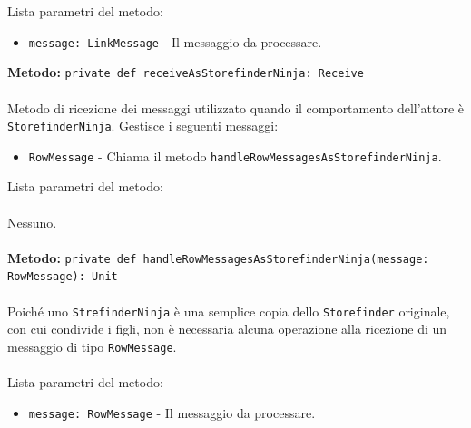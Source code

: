 \documentclass[a4paper]{article}
\begin{document}
			Lista parametri del metodo:
			\begin{itemize}
				\item \texttt{message: LinkMessage} - Il messaggio da processare.
			\end{itemize}	
		\textbf{Metodo: }\texttt{private def receiveAsStorefinderNinja: Receive}
			\\ \\
			Metodo di ricezione dei messaggi utilizzato quando il comportamento dell'attore è \texttt{StorefinderNinja}. Gestisce i seguenti messaggi:
			\begin{itemize}
				\item \texttt{RowMessage} - Chiama il metodo \texttt{handleRowMessagesAsStorefinderNinja}.
			\end{itemize}
			Lista parametri del metodo:
			\\ \\
			Nessuno.
			\\ \\	
		\textbf{Metodo: }\texttt{private def handleRowMessagesAsStorefinderNinja(message: RowMessage): Unit}
			\\ \\
			Poiché uno \texttt{StrefinderNinja} è una semplice copia dello \texttt{Storefinder} originale, con cui condivide i figli, non è necessaria alcuna operazione alla ricezione di un messaggio di tipo \texttt{RowMessage}.
			\\ \\
			Lista parametri del metodo:
			\begin{itemize}
				\item \texttt{message: RowMessage} - Il messaggio da processare.
			\end{itemize}
	
\end{document}
